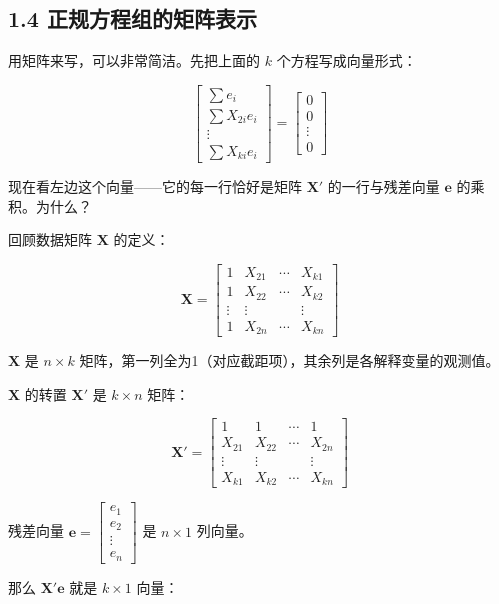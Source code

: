 \documentclass[12pt,a4paper]{ctexart}
\begin{document}
\subsection{1.4 正规方程组的矩阵表示}

用矩阵来写，可以非常简洁。先把上面的 $k$ 个方程写成向量形式：

\[
\begin{bmatrix}
\sum e_i \\
\sum X_{2i} e_i \\
\vdots \\
\sum X_{ki} e_i
\end{bmatrix}
=
\begin{bmatrix}
0 \\ 0 \\ \vdots \\ 0
\end{bmatrix}
\]

现在看左边这个向量——它的每一行恰好是矩阵 $\mathbf{X}'$ 的一行与残差向量 $\mathbf{e}$ 的乘积。为什么？

回顾数据矩阵 $\mathbf{X}$ 的定义：

\[
\mathbf{X} =
\begin{bmatrix}
1 & X_{21} & \cdots & X_{k1} \\
1 & X_{22} & \cdots & X_{k2} \\
\vdots & \vdots & & \vdots \\
1 & X_{2n} & \cdots & X_{kn}
\end{bmatrix}
\]

$\mathbf{X}$ 是 $n \times k$ 矩阵，第一列全为1（对应截距项），其余列是各解释变量的观测值。

$\mathbf{X}$ 的转置 $\mathbf{X}'$ 是 $k \times n$ 矩阵：

\[
\mathbf{X}' =
\begin{bmatrix}
1 & 1 & \cdots & 1 \\
X_{21} & X_{22} & \cdots & X_{2n} \\
\vdots & \vdots & & \vdots \\
X_{k1} & X_{k2} & \cdots & X_{kn}
\end{bmatrix}
\]

残差向量 $\mathbf{e} = \begin{bmatrix} e_1 \\ e_2 \\ \vdots \\ e_n \end{bmatrix}$ 是 $n \times 1$ 列向量。

那么 $\mathbf{X}'\mathbf{e}$ 就是 $k \times 1$ 向量：
\end{document}
